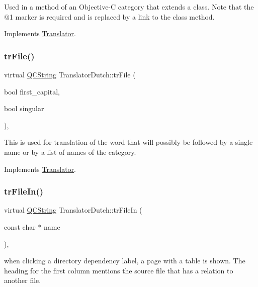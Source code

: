 Used in a method of an Objective-\/C category that extends a class. Note that the @1 marker is required and is replaced by a link to the class method. 

Implements \mbox{\hyperlink{class_translator}{Translator}}.

\mbox{\label{class_translator_dutch_a13ca5c92ff75a2c44962e926d3d55aea}} 
\subsubsection{\texorpdfstring{trFile()}{trFile()}}
{\footnotesize\ttfamily virtual \mbox{\hyperlink{class_q_c_string}{Q\+C\+String}} Translator\+Dutch\+::tr\+File (\begin{DoxyParamCaption}\item[{bool}]{first\+\_\+capital,  }\item[{bool}]{singular }\end{DoxyParamCaption})\hspace{0.3cm}{\ttfamily [inline]}, {\ttfamily [virtual]}}

This is used for translation of the word that will possibly be followed by a single name or by a list of names of the category. 

Implements \mbox{\hyperlink{class_translator}{Translator}}.

\mbox{\label{class_translator_dutch_a6800d32bd5646807f9bec6194b79a11e}} 
\subsubsection{\texorpdfstring{trFileIn()}{trFileIn()}}
{\footnotesize\ttfamily virtual \mbox{\hyperlink{class_q_c_string}{Q\+C\+String}} Translator\+Dutch\+::tr\+File\+In (\begin{DoxyParamCaption}\item[{const char $\ast$}]{name }\end{DoxyParamCaption})\hspace{0.3cm}{\ttfamily [inline]}, {\ttfamily [virtual]}}

when clicking a directory dependency label, a page with a table is shown. The heading for the first column mentions the source file that has a relation to another file. 

